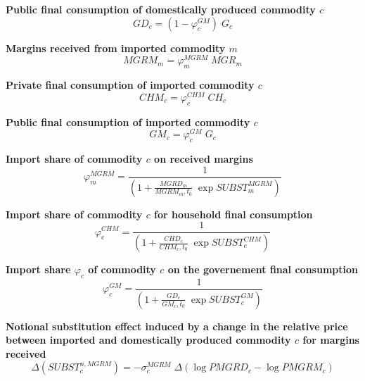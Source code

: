 \documentclass[12pt]{article}
\numberwithin{equation}{section}
\begin{document}
\noindent\textbf{Public final consumption of domestically produced commodity $c$} \\
\begin{dmath}
GD_{c} = \left( 1 - \varphi^{GM}_{c} \right) \; G_{c}
\end{dmath}

\noindent\textbf{Margins received from imported commodity $m$} \\
\begin{dmath}
MGRM_{m} = \varphi^{MGRM}_{m} \; MGR_{m}
\end{dmath}

\noindent\textbf{Private final consumption of imported commodity $c$} \\
\begin{dmath}
CHM_{c} = \varphi^{CHM}_{c} \; CH_{c}
\end{dmath}

\noindent\textbf{Public final consumption of imported commodity $c$} \\
\begin{dmath}
GM_{c} = \varphi^{GM}_{c} \; G_{c}
\end{dmath}

\noindent\textbf{Import share of commodity $c$ on received margins} \\
\begin{dmath}
\varphi^{MGRM}_{m} = \frac{1}{\left( 1 + \frac{MGRD_{m}}{MGRM_{m}, t_{0}} \; \operatorname{exp} SUBST^{MGRM}_{m} \right)}
\end{dmath}

\noindent\textbf{Import share of commodity $c$ for household final consumption} \\
\begin{dmath}
\varphi^{CHM}_{c} = \frac{1}{\left( 1 + \frac{CHD_{c}}{CHM_{c}, t_{0}} \; \operatorname{exp} SUBST^{CHM}_{c} \right)}
\end{dmath}

\noindent\textbf{Import share $\varphi_c$ of commodity $c$ on the governement final consumption} \\
\begin{dmath}
\varphi^{GM}_{c} = \frac{1}{\left( 1 + \frac{GD_{c}}{GM_{c}, t_{0}} \; \operatorname{exp} SUBST^{GM}_{c} \right)}
\end{dmath}

\noindent\textbf{Notional substitution effect induced by a change in the relative price between imported and domestically produced commodity $c$ for margins received} \\
\begin{dmath}
\varDelta \left(SUBST^{n,MGRM}_{c}\right) = -\sigma^{MGRM}_{c} \; \varDelta \left(\operatorname{log} PMGRD_{c} - \operatorname{log} PMGRM_{c}\right)
\end{dmath}
\end{document}
